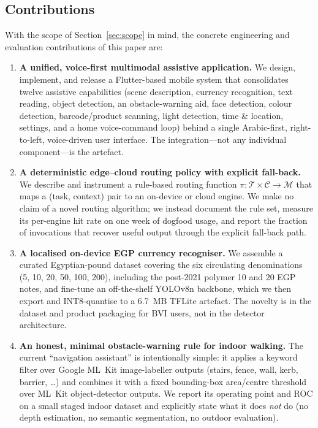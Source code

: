 \documentclass[11pt,a4paper]{article}
\begin{document}
\subsection{Contributions}

With the scope of Section~\ref{sec:scope} in mind, the concrete
engineering and evaluation contributions of this paper are:

\begin{enumerate}
\item \textbf{A unified, voice-first multimodal assistive application.}
We design, implement, and release a Flutter-based mobile system that
consolidates twelve assistive capabilities (scene description, currency
recognition, text reading, object detection, an obstacle-warning aid,
face detection, colour detection, barcode/product scanning, light
detection, time \& location, settings, and a home voice-command loop)
behind a single Arabic-first, right-to-left, voice-driven user
interface. The integration---not any individual component---is the
artefact.

\item \textbf{A deterministic edge--cloud routing policy with explicit
fall-back.} We describe and instrument a rule-based routing function
$\pi: \mathcal{T} \times \mathcal{C} \rightarrow \mathcal{M}$ that maps a
(task, context) pair to an on-device or cloud engine. We make no claim
of a novel routing algorithm; we instead document the rule set, measure
its per-engine hit rate on one week of dogfood usage, and report the
fraction of invocations that recover useful output through the explicit
fall-back path.

\item \textbf{A localised on-device EGP currency recogniser.}
We assemble a curated Egyptian-pound dataset covering the six
circulating denominations (5, 10, 20, 50, 100, 200), including the
post-2021 polymer 10 and 20 EGP notes, and fine-tune an off-the-shelf
YOLOv8n backbone, which we then export and INT8-quantise to a 6.7~MB
TFLite artefact. The novelty is in the dataset and product packaging
for BVI users, not in the detector architecture.

\item \textbf{An honest, minimal obstacle-warning rule for indoor
walking.} The current ``navigation assistant'' is intentionally simple:
it applies a keyword filter over Google ML~Kit image-labeller outputs
(stairs, fence, wall, kerb, barrier, \ldots) and combines it with a
fixed bounding-box area/centre threshold over ML~Kit object-detector
outputs. We report its operating point and ROC on a small staged
indoor dataset and explicitly state what it does \emph{not} do
(no depth estimation, no semantic segmentation, no outdoor
evaluation).


\end{enumerate}
\end{document}
